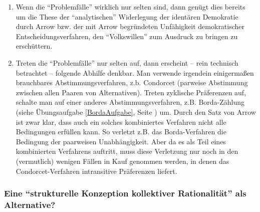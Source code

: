 \begin{enumerate}
  \item Wenn die "`Problemfälle"' wirklich nur selten sind, dann genügt dies
  bereits um die These der "`analytischen"' Widerlegung der identären
  Demokratie durch Arrow \cite[]{nida-ruemelin:1991} bzw. der mit
  Arrow begründeten Unfähigkeit demokratischer Entscheidungsverfahren, den
  "`Volkswillen"' zum Ausdruck zu bringen \cite[]{riker:1982} zu erschüttern.
  
  \item Treten die "`Problemfälle"' nur selten auf, dann erscheint -- rein
  technisch betrachtet -- folgende Abhilfe denkbar. Man verwende irgendein
  einigermaßen brauchbares Abstimmungsverfahren, z.b. Condorcet (parweise
  Abstimmung zwischen allen Paaren von Alternativen). Treten zyklische
  Präferenzen auf, schalte man auf einer anderes Abstimmungsverfahren, z.B.
  Borda-Zählung (siehe Übungsaufgabe \ref{BordaAufgabe}, Seite
  \pageref{BordaAufgabe}) um. Durch den Satz von Arrow ist zwar klar, dass auch
  ein solches kombiniertes Verfahren nicht alle Bedingungen erfüllen kann. So
  verletzt z.B. das Borda-Verfahren die Bedingung der paarweisen
  Unabhängigkeit. Aber da es als Teil eines kombinierten Verfahrens auftritt,
  muss diese Verletzung nur noch in den (vermutlich) wenigen Fällen in Kauf
  genommen werden, in denen das Condorcet-Verfahren intransitive Präferenzen
  liefert.
\end{enumerate}


\subsubsection{Eine "`strukturelle Konzeption kollektiver Rationalität"' als
Alternative?}

